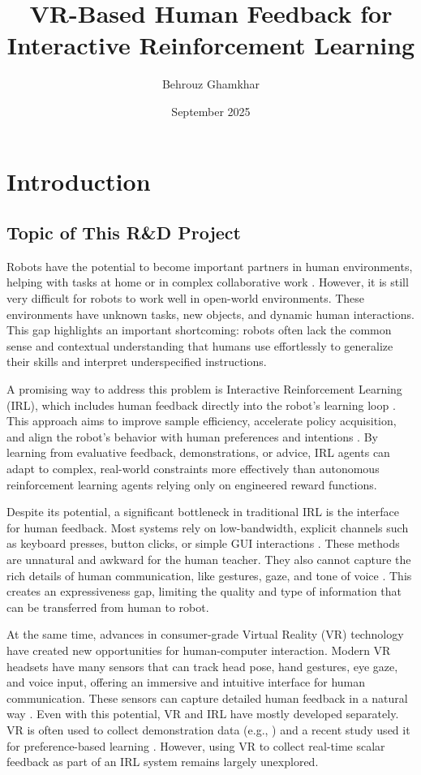 \documentclass[rnd]{mas_proposal}
\title{VR-Based Human Feedback for Interactive Reinforcement Learning}
\author{Behrouz Ghamkhar}
\date{September 2025}
\begin{document}
\maketitle

\pagestyle{plain}

\section{Introduction}

\subsection{Topic of This R\&D Project}
Robots have the potential to become important partners in human environments, helping with tasks at home or in complex collaborative work \citep{Chetouani2021, Akalin2021}. However, it is still very difficult for robots to work well in open-world environments. These environments have unknown tasks, new objects, and dynamic human interactions. This gap highlights an important shortcoming: robots often lack the common sense and contextual understanding that humans use effortlessly to generalize their skills and interpret underspecified instructions.

A promising way to address this problem is Interactive Reinforcement Learning (IRL), which includes human feedback directly into the robot's learning loop \citep{Lin2020, BradleyKnox2008}. This approach aims to improve sample efficiency, accelerate policy acquisition, and align the robot's behavior with human preferences and intentions \citep{Lin2020}. By learning from evaluative feedback, demonstrations, or advice, IRL agents can adapt to complex, real-world constraints more effectively than autonomous reinforcement learning agents relying only on engineered reward functions.

Despite its potential, a significant bottleneck in traditional IRL is the interface for human feedback. Most systems rely on low-bandwidth, explicit channels such as keyboard presses, button clicks, or simple GUI interactions \citep{Faulkner2020, Loftin2014}. These methods are unnatural and awkward for the human teacher. They also cannot capture the rich details of human communication, like gestures, gaze, and tone of voice \citep{9794595, Lin2020a}. This creates an expressiveness gap, limiting the quality and type of information that can be transferred from human to robot.

At the same time, advances in consumer-grade Virtual Reality (VR) technology have created new opportunities for human-computer interaction. Modern VR headsets have many sensors that can track head pose, hand gestures, eye gaze, and voice input, offering an immersive and intuitive interface for human communication. These sensors can capture detailed human feedback in a natural way \citep{Winkler2022,Luo2024}. Even with this potential, VR and IRL have mostly developed separately. VR is often used to collect demonstration data (e.g., \citep{10904309, Mosbach2022}) and a recent study used it for preference-based learning \citep{Heuvel2025}. However, using VR to collect real-time scalar feedback as part of an IRL system remains largely unexplored.
\end{document}
